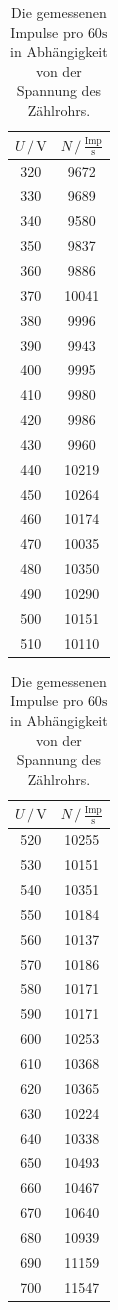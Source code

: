 \begin{table}
  \centering
  \caption{Die gemessenen Impulse pro $60\si{\second}$ in Abhängigkeit von der Spannung des Zählrohrs.}
  \begin{tabular}[t]{cc}
    \toprule
    $U \, /\, \si{\V}$ & $N \,/\, \frac{\text{Imp}}{\si{\second}}$\\
    \midrule
    320 & 9672    \\
    330 & 9689    \\
    340 & 9580    \\
    350 & 9837    \\
    360 & 9886    \\
    370 & 10041   \\
    380 & 9996    \\
    390 & 9943    \\
    400 & 9995    \\
    410 & 9980    \\
    420 & 9986    \\
    430 & 9960    \\
    440 & 10219   \\
    450 & 10264   \\
    460 & 10174   \\
    470 & 10035   \\
    480 & 10350   \\
    490 & 10290   \\
    500 & 10151   \\
    510 & 10110   \\
    \bottomrule
  \end{tabular}
  \begin{tabular}[t]{cc}
    \toprule
    $U \, /\, \si{\V}$ & $N \,/\, \frac{\text{Imp}}{\si{\second}}$\\
    \midrule
    520 & 10255   \\
    530 & 10151   \\
    540 & 10351   \\
    550 & 10184   \\
    560 & 10137   \\
    570 & 10186   \\
    580 & 10171   \\
    590 & 10171   \\
    600 & 10253   \\
    610 & 10368   \\
    620 & 10365   \\
    630 & 10224   \\
    640 & 10338   \\
    650 & 10493   \\
    660 & 10467   \\
    670 & 10640   \\
    680 & 10939   \\
    690 & 11159   \\
    700 & 11547   \\
    \bottomrule
  \end{tabular}
\label{tab:imps}
\end{table}
